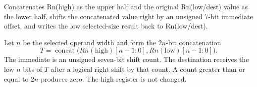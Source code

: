 Concatenates Rn(high) as the upper half and the original Rn(low/dest) value as the lower half, shifts the concatenated value right by an unsigned 7-bit immediate offset, and writes the low selected-size result back to Rn(low/dest).

Let \(n\) be the selected operand width and form the \(2n\)-bit concatenation
\[
  T = \operatorname{concat}\bigl(Rn(\mathrm{high})[n-1:0],
                                Rn(\mathrm{low})[n-1:0]\bigr).
\]
The immediate is an unsigned seven-bit shift count. The destination receives the low \(n\) bits of \(T\) after a logical right shift by that count. A count greater than or equal to \(2n\) produces zero. The high register is not changed.
